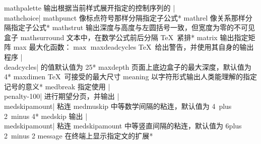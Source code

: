 \capcs mathpalette {输出根据当前样式展开指定的控制序列的 |\\mathchoice|}{}{}
\capcs mathpunct {像标点符号那样分隔指定子公式}*{}
\capcs mathrel {像关系那样分隔指定子公式}*{}
\capcs mathstrut {输出深度与高度与左圆括号一致，但宽度为零的不可见盒子}{}{}
\capcs mathsurround {文本中，在数学公式前后分隔 \TeX\ 紧排}*{}
\capcs matrix {输出指定矩阵}{}{}
\capcs max {最大化函数：$\max$}{}{}
\capcs maxdeadcycles {\TeX\ 给出警告，并使用其自身的输出程序 |\\deadcycles| 的值默认值为 25}*{}
\capcs maxdepth {页面上底边盒子的最大深度，默认值为 4\pt}*{}
\capcs maxdimen {\TeX\ 可接受的最大尺寸}{}{}
\capcs meaning {以字符形式输出人类能理解的指定记号的意义}*{}
\capcs medbreak {指定使用 |\\penalty-100| 进行期望分页，并输出 |\\medskipamount| 粘连}{}{}
\capcs medmuskip {中等数学间隔的粘连，默认值为 4\mud\ plus 2\mud\ minus 4\mud}*{}
\capcs medskip {输出 |\\medskipamount| 粘连}{}{}
\capcs medskipamount {中等竖直间隔的粘连，默认值为 6\pt plus 2\pt\ minus 2\pt}{}{}
\capcs message {在终端上显示指定文的扩展}*{}

